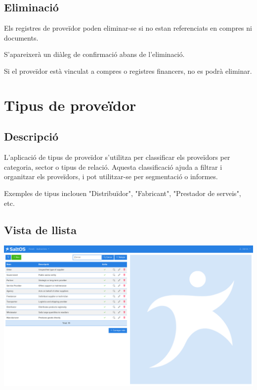 \documentclass[a4paper]{article}
\begin{document}
\hypertarget{toc130}{}
\subsection{Eliminació}

Els registres de proveïdor poden eliminar-se si no estan referenciats en compres ni documents.

S'apareixerà un diàleg de confirmació abans de l'eliminació.

Si el proveïdor està vinculat a compres o registres financers, no es podrà eliminar.


\hypertarget{toc131}{}
\section{Tipus de proveïdor}

\hypertarget{toc132}{}
\subsection{Descripció}

L'aplicació de tipus de proveïdor s'utilitza per classificar els proveïdors per categoria, sector o tipus de relació.
Aquesta classificació ajuda a filtrar i organitzar els proveïdors, i pot utilitzar-se per segmentació o informes.

Exemples de tipus inclouen "Distribuïdor", "Fabricant", "Prestador de serveis", etc.

\hypertarget{toc133}{}
\subsection{Vista de llista}

\begin{center}\includegraphics[width=1\textwidth]{../ujest/snaps/test-screenshots-js-screenshots-purchases-suppliers-types-list-ca-es-1-snap.png}\end{center}
\end{document}
